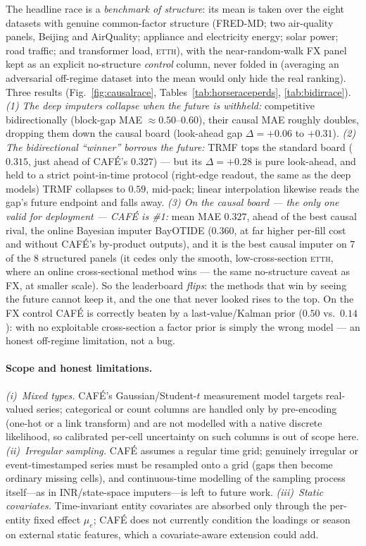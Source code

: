 \documentclass[10pt,twocolumn]{article}
\newcommand{\cafe}{CAF\'E}
\begin{document}
The headline race is a \emph{benchmark of structure}: its mean is taken over the
eight datasets with genuine common-factor structure (FRED-MD; two air-quality
panels, Beijing and AirQuality; appliance and electricity energy; solar power; road
traffic; and transformer load, \textsc{etth}),
with the near-random-walk FX panel kept as an explicit no-structure \emph{control}
column, never folded in (averaging an adversarial off-regime dataset into the mean
would only hide the real ranking). Three results (Fig.~\ref{fig:causalrace},
Tables~\ref{tab:horseraceperds}, \ref{tab:bidirrace}). \emph{(1) The deep imputers
collapse when the future is withheld:} competitive bidirectionally (block-gap MAE
$\approx0.50$--$0.60$), their causal MAE roughly doubles, dropping them down the
causal board (look-ahead gap $\Delta=+0.06$ to $+0.31$). \emph{(2) The
bidirectional ``winner'' borrows the future:} TRMF tops the standard board
($0.315$, just ahead of \cafe{}'s $0.327$) --- but its $\Delta=+0.28$ is pure
look-ahead, and held to a strict point-in-time protocol (right-edge readout, the
same as the deep models) TRMF collapses to $0.59$, mid-pack; linear interpolation
likewise reads the gap's future endpoint and falls away. \emph{(3) On the causal
board --- the only one valid for deployment --- \cafe{} is \#1:} mean MAE $0.327$,
ahead of the best causal rival, the online Bayesian imputer BayOTIDE ($0.360$, at
far higher per-fill cost and without \cafe{}'s by-product outputs), and it is the
best causal imputer on $7$ of the $8$ structured panels (it cedes only the smooth,
low-cross-section \textsc{etth}, where an online cross-sectional method wins ---
the same no-structure caveat as FX, at smaller scale). So the leaderboard
\emph{flips}: the methods that win by seeing the future cannot keep it, and the one
that never looked rises to the top. On the FX control \cafe{} is correctly beaten
by a last-value/Kalman prior ($0.50$ vs.\ $0.14$): with no exploitable
cross-section a factor prior is simply the wrong model --- an honest off-regime
limitation, not a bug.

\paragraph{Scope and honest limitations.} \emph{(i)~Mixed types.} \cafe{}'s
Gaussian/Student-$t$ measurement model targets real-valued series; categorical or
count columns are handled only by pre-encoding (one-hot or a link transform) and are
not modelled with a native discrete likelihood, so calibrated per-cell uncertainty on
such columns is out of scope here. \emph{(ii)~Irregular sampling.} \cafe{} assumes a
regular time grid; genuinely irregular or event-timestamped series must be resampled
onto a grid (gaps then become ordinary missing cells), and continuous-time modelling
of the sampling process itself---as in INR/state-space imputers---is left to future
work. \emph{(iii)~Static covariates.} Time-invariant entity covariates are absorbed
only through the per-entity fixed effect $\mu_e$; \cafe{} does not currently condition
the loadings or season on external static features, which a covariate-aware extension
could add.
\end{document}
